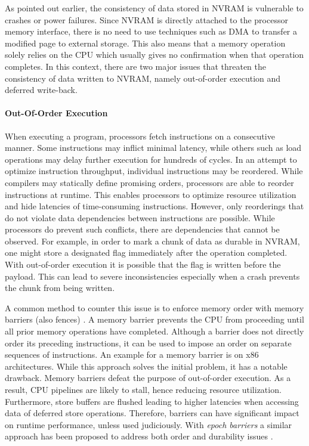 As pointed out earlier, the consistency of data stored in NVRAM is vulnerable to
crashes or power failures. Since NVRAM is directly attached to the processor
memory interface, there is no need to use techniques such as DMA to transfer a
modified page to external storage. This also means that a memory operation
solely relies on the CPU which usually gives no confirmation when that operation
completes. In this context, there are two major issues that threaten the
consistency of data written to NVRAM, namely out-of-order execution and deferred
write-back.

\paragraph{Out-Of-Order Execution}

When executing a program, processors fetch instructions on a consecutive manner.
Some instructions may inflict minimal latency, while others such as load
operations may delay further execution for hundreds of cycles. In an attempt to
optimize instruction throughput, individual instructions may be reordered. While
compilers may statically define promising orders, processors are able to reorder
instructions at runtime. This enables processors to optimize resource
utilization and hide latencies of time-consuming instructions. However, only
reorderings that do not violate data dependencies between instructions are
possible. While processors do prevent such conflicts, there are dependencies
that cannot be observed. For example, in order to mark a chunk of data as
durable in NVRAM, one might store a designated flag immediately after the
operation completed. With out-of-order execution it is possible that the flag is
written before the payload. This can lead to severe inconsistencies especially
when a crash prevents the chunk from being written.

A common method to counter this issue is to enforce memory order with memory
barriers (also fences) \cite{dulloor2014system, schwalb2016hyrise,
oukid2017data}. A memory barrier prevents the CPU from proceeding until all
prior memory operations have completed. Although a barrier does not directly
order its preceding instructions, it can be used to impose an order on separate
sequences of instructions. An example for a memory barrier is  on
x86 architectures. While this approach solves the initial problem, it has a
notable drawback. Memory barriers defeat the purpose of out-of-order execution.
As a result, CPU pipelines are likely to stall, hence reducing resource
utilization. Furthermore, store buffers are flushed leading to higher latencies
when accessing data of deferred store operations. Therefore, barriers can have
significant impact on runtime performance, unless used judiciously. With
\emph{epoch barriers} a similar approach has been proposed to address both order
and durability issues \cite{condit2009better}.

